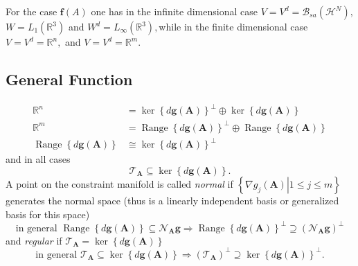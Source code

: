 \documentclass[aps,preprint]{revtex4}%
\begin{document}
For the case $\boldsymbol{f}\left(  A\right)  $ one has in the infinite
dimensional case $V=V^{d}=\mathcal{B}_{sa}\left(  \mathcal{H}^{N}\right)  ,$
$W=L_{1}\left(  \mathbb{R}^{3}\right)  $ and $W^{d}=L_{\infty}\left(
\mathbb{R}^{3}\right)  ,$while in the finite dimensional case $V=V^{d}%
=\mathbb{R}^{n},$ and $V=V^{d}=\mathbb{R}^{m}.$

\subsection{General Function}%

\begin{align}
\mathbb{R}^{n}  &  =\ker\left\{  d\boldsymbol{g}\left(  \boldsymbol{A}\right)
\right\}  ^{\bot}\oplus\ker\left\{  d\boldsymbol{g}\left(  \boldsymbol{A}%
\right)  \right\} \nonumber\\
\mathbb{R}^{m}  &  =\operatorname*{Range}\left\{  d\boldsymbol{g}\left(
\boldsymbol{A}\right)  \right\}  ^{\bot}\oplus\operatorname*{Range}\left\{
d\boldsymbol{g}\left(  \boldsymbol{A}\right)  \right\} \nonumber\\
\operatorname*{Range}\left\{  d\boldsymbol{g}\left(  \boldsymbol{A}\right)
\right\}   &  \cong\ker\left\{  d\boldsymbol{g}\left(  \boldsymbol{A}\right)
\right\}  ^{\bot}%
\end{align}
and in all cases
\begin{equation}
\mathcal{T}_{\boldsymbol{A}}\subseteq\ker\left\{  d\boldsymbol{g}\left(
\boldsymbol{A}\right)  \right\}  .
\end{equation}
A point on the constraint manifold is called \emph{normal }if $\left\{
\left.  \nabla g_{j}\left(  \boldsymbol{A}\right)  \right\vert 1\leq j\leq
m\right\}  $ generates the normal space (thus is a linearly independent basis
or generalized basis for this space)
\begin{equation}
\text{in general }\operatorname*{Range}\left\{  d\boldsymbol{g}\left(
\boldsymbol{A}\right)  \right\}  \subseteq\mathcal{N}_{\boldsymbol{A}%
}\boldsymbol{g}\Rightarrow\operatorname*{Range}\left\{  d\boldsymbol{g}\left(
\boldsymbol{A}\right)  \right\}  ^{\bot}\supseteq\left(  \mathcal{N}%
_{\boldsymbol{A}}\boldsymbol{g}\right)  ^{\bot}%
\end{equation}
and \emph{regular }if $\mathcal{T}_{\boldsymbol{A}}=\ker\left\{
d\boldsymbol{g}\left(  \boldsymbol{A}\right)  \right\}  $%
\begin{equation}
\text{in general }\mathcal{T}_{\boldsymbol{A}}\subseteq\ker\left\{
d\boldsymbol{g}\left(  \boldsymbol{A}\right)  \right\}  \Rightarrow\left(
\mathcal{T}_{\boldsymbol{A}}\right)  ^{\bot}\supseteq\ker\left\{
d\boldsymbol{g}\left(  \boldsymbol{A}\right)  \right\}  ^{\bot}.
\end{equation}
\end{document}
